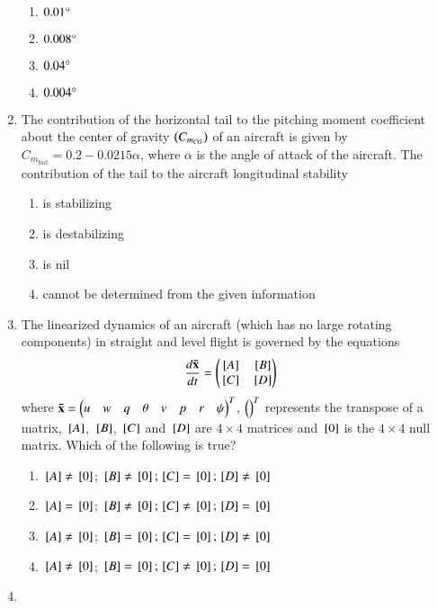 \documentclass[journal]{IEEEtran}
\begin{document}
\begin{enumerate}
		\begin{enumerate}
			\item $0.01 \degree$
			\item $0.008 \degree$
			\item $0.04 \degree$
			\item $0.004 \degree$
		\end{enumerate}
	\item 
	The contribution of the horizontal tail to the pitching moment coefficient about the center of gravity $\left(C_{m_{CG}}\right)$ of an aircraft is given by $C_{m_{tail}} = 0.2 - 0.0215\alpha$, where $\alpha$ is the angle of attack of the aircraft. The contribution of the tail to the aircraft longitudinal stability
		\begin{enumerate}
			\item is stabilizing
			\item is destabilizing
			\item is nil
			\item cannot be determined from the given information
		\end{enumerate}
	\item
	The linearized dynamics of an aircraft (which has no large rotating components) in straight and level flight is governed by the equations
	\begin{align}
		\frac{d\mathbf{\bar{x}}}{dt} &= \begin{pmatrix}{}\left[A\right] & {}\left[B\right] \\ {}\left[C\right] & {}\left[D\right]\end{pmatrix}
	\end{align}
	where $\mathbf{\bar{x}} = \begin{pmatrix}u & w & q & \theta & v & p & r & \psi\end{pmatrix}^{T}$, $\begin{pmatrix}{}\end{pmatrix}^{T}$ represents the transpose of a matrix, ${}\left[A\right]$, ${}\left[B\right]$, ${}\left[C\right]$ and ${}\left[D\right]$ are $4 \times 4$ matrices and ${}\left[0\right]$ is the $4 \times 4$ null matrix. Which of the following is true?
		\begin{enumerate}
			\item ${}\left[A\right] \neq {}\left[0\right]$; ${}\left[B\right] \neq {}\left[0\right]; {}\left[C\right] = {}\left[0\right]; {}\left[D\right] \neq {}\left[0\right]$
			\item ${}\left[A\right] = {}\left[0\right]$; ${}\left[B\right] \neq {}\left[0\right]; {}\left[C\right] \neq {}\left[0\right]; {}\left[D\right] = {}\left[0\right]$
			\item ${}\left[A\right] \neq {}\left[0\right]$; ${}\left[B\right] = {}\left[0\right]; {}\left[C\right] = {}\left[0\right]; {}\left[D\right] \neq {}\left[0\right]$
			\item ${}\left[A\right] \neq {}\left[0\right]$; ${}\left[B\right] = {}\left[0\right]; {}\left[C\right] \neq {}\left[0\right]; {}\left[D\right] = {}\left[0\right]$
		\end{enumerate}
	\item

\end{enumerate}
\end{document}
